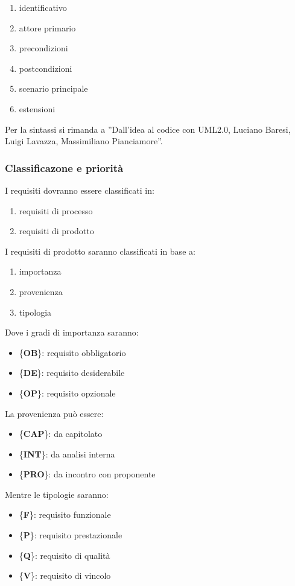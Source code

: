 {{{			\begin{enumerate}
				\item identificativo
				\item attore primario
				\item precondizioni
				\item postcondizioni
				\item scenario principale
				\item estensioni
			\end{enumerate}
			Per la sintassi si rimanda a ”Dall’idea al codice con UML2.0, Luciano Baresi, Luigi Lavazza, Massimiliano Pianciamore”.
			}
			\subsubsection{Classificazone e priorit\`{a}}{
				I requisiti dovranno essere classificati in:
				\begin{enumerate}
					\item requisiti di processo
					\item requisiti di prodotto
				\end{enumerate}
				I requisiti di prodotto saranno classificati in base a:
				\begin{enumerate}
					\item importanza
					\item provenienza
					\item tipologia
				\end{enumerate}
				Dove i gradi di importanza saranno:
				\begin{itemize}
						\item \{\textbf{OB}\}: requisito obbligatorio
						\item \{\textbf{DE}\}: requisito desiderabile
						\item \{\textbf{OP}\}: requisito opzionale
				\end{itemize}
				La provenienza pu\`{o} essere:
				\begin{itemize}
					\item \{\textbf{CAP}\}: da capitolato
					\item \{\textbf{INT}\}: da analisi interna
					\item \{\textbf{PRO}\}: da incontro con proponente
				\end{itemize}
				Mentre le tipologie saranno:
				\begin{itemize}
					\item \{\textbf{F}\}: requisito funzionale
					\item \{\textbf{P}\}: requisito prestazionale
					\item \{\textbf{Q}\}: requisito di qualit\`{a}
					\item \{\textbf{V}\}: requisito di vincolo
				\end{itemize}
			}
}}
